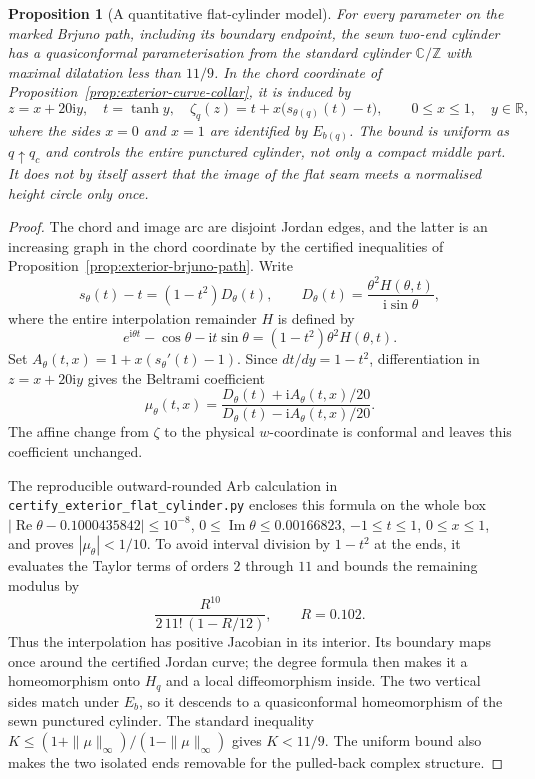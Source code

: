 \documentclass[11pt]{amsart}
\newtheorem{proposition}[theorem]{Proposition}
\theoremstyle{definition}
\newcommand{\ii}{\mathrm{i}}
\begin{document}
\begin{proposition}[A quantitative flat-cylinder model]
\label{prop:exterior-flat-cylinder}
For every parameter on the marked Brjuno path, including its boundary
endpoint, the sewn two-end cylinder has a quasiconformal
parameterisation from the standard cylinder $\mathbb C/\mathbb Z$
with maximal dilatation less than $11/9$.  In the chord coordinate of
Proposition~\ref{prop:exterior-curve-collar}, it is induced by
\[
 z=x+20\ii y,\quad t=\tanh y,\quad
 \zeta_q(z)=t+x\bigl(s_{\theta(q)}(t)-t\bigr),
 \qquad 0\le x\le1,\quad y\in\mathbb R,
\]
where the sides $x=0$ and $x=1$ are identified by $E_{b(q)}$.
The bound is uniform as $q\uparrow q_c$ and controls the entire
punctured cylinder, not only a compact middle part.  It does not by
itself assert that the image of the flat seam meets a normalised
height circle only once.
\end{proposition}

\begin{proof}
The chord and image arc are disjoint Jordan edges, and the latter is
an increasing graph in the chord coordinate by the certified
inequalities of Proposition~\ref{prop:exterior-brjuno-path}.  Write
\[
 s_\theta(t)-t=(1-t^2)D_\theta(t),\qquad
 D_\theta(t)=\frac{\theta^2H(\theta,t)}{\ii\sin\theta},
\]
where the entire interpolation remainder $H$ is defined by
\[
 e^{\ii\theta t}-\cos\theta-\ii t\sin\theta
       =(1-t^2)\theta^2H(\theta,t).
\]
Set $A_\theta(t,x)=1+x(s_\theta'(t)-1)$.
Since $dt/dy=1-t^2$, differentiation in $z=x+20\ii y$
gives the Beltrami coefficient
\[
 \mu_\theta(t,x)=
 \frac{D_\theta(t)+\ii A_\theta(t,x)/20}
      {D_\theta(t)-\ii A_\theta(t,x)/20}.
\]
The affine change from $\zeta$ to the physical $w$-coordinate is
conformal and leaves this coefficient unchanged.

The reproducible outward-rounded Arb calculation in
\texttt{certify\_exterior\_flat\_cylinder.py} encloses this formula
on the whole box
$|\operatorname{Re}\theta-0.1000435842|\le10^{-8}$,
$0\le\operatorname{Im}\theta\le0.00166823$,
$-1\le t\le1$, $0\le x\le1$, and proves
$|\mu_\theta|<1/10$.  To avoid interval division by $1-t^2$ at the
ends, it evaluates the Taylor terms of orders $2$ through $11$ and bounds
the remaining modulus by
\[
 \frac{R^{10}}{2\,11!\,(1-R/12)},\qquad R=0.102.
\]
Thus the interpolation has positive Jacobian in its interior.  Its
boundary maps once around the certified Jordan curve; the degree
formula then makes it a homeomorphism onto $H_q$ and a local
diffeomorphism inside.  The two vertical sides match under $E_b$,
so it descends to a quasiconformal homeomorphism of the sewn
punctured cylinder.  The standard inequality
$K\le(1+\|\mu\|_\infty)/(1-\|\mu\|_\infty)$ gives $K<11/9$.
The uniform bound also makes the two isolated ends removable for the
pulled-back complex structure.
\end{proof}
\end{document}
